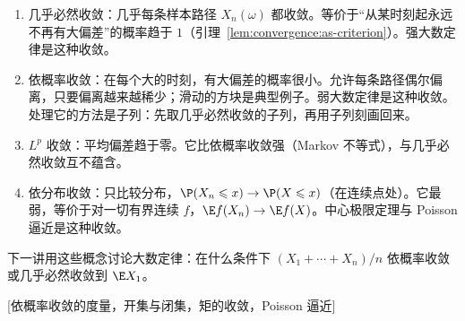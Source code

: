 
\begin{enumerate}
\item 几乎必然收敛：几乎每条样本路径 $X_n(\omega)$ 都收敛。等价于“从某时刻起永远不再有大偏差”的概率趋于 $1$（引理~\ref{lem:convergence:as-criterion}）。强大数定律是这种收敛。
\item 依概率收敛：在每个大的时刻，有大偏差的概率很小。允许每条路径偶尔偏离，只要偏离越来越稀少；滑动的方块是典型例子。弱大数定律是这种收敛。处理它的方法是子列：先取几乎必然收敛的子列，再用子列刻画回来。
\item $L^p$ 收敛：平均偏差趋于零。它比依概率收敛强（Markov 不等式），与几乎必然收敛互不蕴含。
\item 依分布收敛：只比较分布，$\P(X_n\leqslant x)\to \P(X\leqslant x)$（在连续点处）。它最弱，等价于对一切有界连续 $f$，$\E f(X_n)\to \E f(X)$。中心极限定理与 Poisson 逼近是这种收敛。
\end{enumerate}
下一讲用这些概念讨论大数定律：在什么条件下 $(X_1+\cdots+X_n)/n$ 依概率收敛或几乎必然收敛到 $\E X_1$。

[依概率收敛的度量，开集与闭集，矩的收敛，Poisson 逼近]
\label{hw:convergence}


